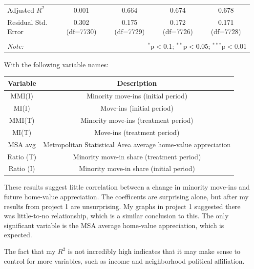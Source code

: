 \documentclass{article}
\begin{document}
\begin{table}[!htbp]
\begin{tabular}{@{\extracolsep{5pt}}lcccc}
     Adjusted $R^2$ & 0.001 & 0.664 & 0.674 & 0.678 \\
     Residual Std. Error & 0.302 (df=7730) & 0.175 (df=7729) & 0.172 (df=7726) & 0.171 (df=7728) \\
    \hline
    \hline \\[-1.8ex]
    \textit{Note:} & \multicolumn{4}{r}{$^{*}$p$<$0.1; $^{**}$p$<$0.05; $^{***}$p$<$0.01} \\
    \end{tabular}
\end{table}
\newpage
With the following variable names:

\begin{tabular}{cc}
    Variable & Description \\\hline
    MMI(I) & Minority move-ins (initial period) \\
    MI(I) & Move-ins (initial period) \\
    MMI(T) & Minority move-ins (treatment period) \\
    MI(T) & Move-ins (treatment period) \\
    MSA avg & Metropolitan Statistical Area average home-value appreciation \\
    Ratio (T) & Minority move-in share (treatment period) \\
    Ratio (I) & Minority move-in share (initial period)
\end{tabular}    
These results suggest little correlation between a change in minority move-ins and future home-value appreciation. The coefficents are surprising alone, but after my results from project 1 are unsurprising. My graphs in project 1 suggested there was little-to-no relationship, which is a similar conclusion to this. The only significant variable is the MSA average home-value appreciation, which is expected.

The fact that my $R^2$ is not incredibly high indicates that it may make sense to control for more variables, such as income and neighborhood political affiliation.
\end{document}
